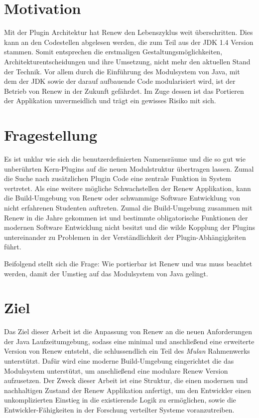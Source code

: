 \section{Motivation} \label{sec:motivation}
	Mit der Plugin Architektur hat Renew den Lebenszyklus weit überschritten. Dies kann an den Codestellen abgelesen werden, die zum Teil aus der JDK 1.4 Version stammen. Somit entsprechen die erstmaligen Gestaltungsmöglichkeiten, Architekturentscheidungen und ihre Umsetzung, nicht mehr den aktuellen Stand der Technik. Vor allem durch die Einführung des Modulsystem von Java, mit dem der JDK sowie der darauf aufbauende Code modularisiert wird, ist der Betrieb von Renew in der Zukunft gefährdet. Im Zuge dessen ist das Portieren der Applikation unvermeidlich und trägt ein gewisses Risiko mit sich.

\section{Fragestellung} \label{sec:KdS}
	Es ist unklar wie sich die benutzerdefinierten Namensräume und die so gut wie unberührten Kern-Plugins auf die neuen Modulstruktur übertragen lassen. Zumal die Suche nach zusätzlichen Plugin Code eine zentrale Funktion in System vertretet.\newline
	Als eine weitere mögliche Schwachstellen der Renew Applikation, kann die Build-Umgebung von Renew oder schwammige Software Entwicklung von nicht erfahrenen Studenten auftreten. Zumal die Build-Umgebung zusammen mit Renew in die Jahre gekommen ist und bestimmte obligatorische Funktionen der modernen Software Entwicklung nicht besitzt und die wilde Kopplung der Plugins untereinander zu Problemen in der Verständlichkeit der Plugin-Abhängigkeiten führt.\bigbreak

	Beifolgend stellt sich die Frage: Wie portierbar ist Renew und was muss beachtet werden, damit der Umstieg auf das Modulsystem von Java gelingt.

\section{Ziel} \label{sec:Z}

	Das Ziel dieser Arbeit ist die Anpassung von Renew an die neuen Anforderungen der Java Laufzeitumgebung, sodass eine minimal und anschließend eine erweiterte Version von Renew entsteht, die schlussendlich ein Teil des \textit{Mulan} Rahmenwerks unterstützt. Dafür wird eine moderne Build-Umgebung eingerichtet die das Modulsystem unterstützt, um anschließend eine modulare Renew Version aufzusetzen. 
	Der Zweck dieser Arbeit ist eine Struktur, die einen modernen und nachhaltigen Zustand der Renew Applikation anfertigt, um den Entwickler einen unkomplizierten Einstieg in die existierende Logik zu ermöglichen, sowie die Entwickler-Fähigkeiten in der Forschung verteilter Systeme voranzutreiben.\bigbreak

